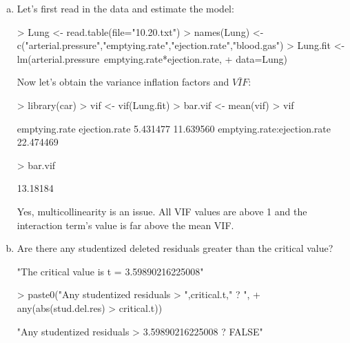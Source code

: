 \documentclass{article}
\begin{document}
\begin{enumerate}[a)]

\item{} Let's first read in the data and estimate the model:
\begin{Schunk}
\begin{Sinput}
> Lung <- read.table(file="10.20.txt")
> names(Lung) <- c("arterial.pressure","emptying.rate","ejection.rate","blood.gas")
> Lung.fit <- lm(arterial.pressure~emptying.rate*ejection.rate,
+                data=Lung)
\end{Sinput}
\end{Schunk}

Now let's obtain the variance inflation factors and $\bar{VIF}$:
\begin{Schunk}
\begin{Sinput}
> library(car)
> vif <- vif(Lung.fit)
> bar.vif <- mean(vif)
> vif
\end{Sinput}
\begin{Soutput}
              emptying.rate               ejection.rate 
                   5.431477                   11.639560 
emptying.rate:ejection.rate 
                  22.474469 
\end{Soutput}
\begin{Sinput}
> bar.vif
\end{Sinput}
\begin{Soutput}
[1] 13.18184
\end{Soutput}
\end{Schunk}

Yes, multicollinearity is an issue. All VIF values are above 1 and the interaction term's value is far above the mean VIF.

\item{} Are there any studentized deleted residuals greater than the critical value?
\begin{Schunk}
\begin{Soutput}
[1] "The critical value is t = 3.59890216225008"
\end{Soutput}
\begin{Sinput}
> paste0("Any studentized residuals > ",critical.t," ?  ",
+        any(abs(stud.del.res) > critical.t))
\end{Sinput}
\begin{Soutput}
[1] "Any studentized residuals > 3.59890216225008 ?  FALSE"
\end{Soutput}
\end{Schunk}


\end{enumerate}
\end{document}
